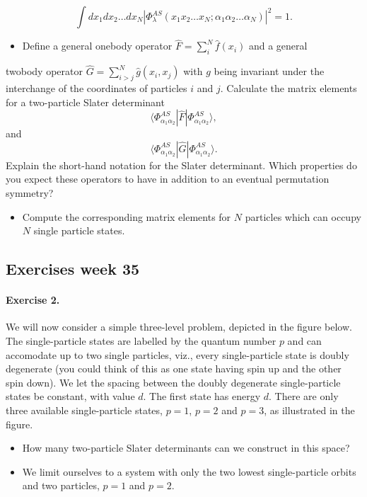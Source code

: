 \documentclass[%
twoside,                 %
final,                   %
10pt]{article}
\begin{document}
\noindent
\[
\int dx_{1}dx_{2}\dots dx_{N}\left\vert
\Phi_{\lambda}^{AS}(x_{1}x_{2}\dots x_{N};\alpha_{1}\alpha_{2}\dots\alpha_{N})
\right\vert^{2} = 1.
\]
\begin{itemize}
\item Define a general onebody operator $\hat{F} = \sum_{i}^N\hat{f}(x_{i})$ and a general 
\end{itemize}

\noindent
twobody operator $\hat{G}=\sum_{i>j}^N\hat{g}(x_{i},x_{j})$
with $g$ being invariant under the interchange of the coordinates of particles $i$ and $j$.
Calculate the matrix elements for a two-particle Slater determinant
\[
\langle\Phi_{\alpha_{1}\alpha_{2}}^{AS}|\hat{F}|\Phi_{\alpha_{1}\alpha_{2}}^{AS} \rangle,
\]
and
\[
\langle \Phi_{\alpha_{1}\alpha_{2}}^{AS}|\hat{G}|\Phi_{\alpha_{1}\alpha_{2}}^{AS}\rangle.
\]
Explain the short-hand notation for the Slater determinant.
Which properties do you expect these operators to have in addition to an eventual permutation
symmetry?
\begin{itemize}
\item Compute the corresponding matrix elements for $N$ particles which can occupy $N$ single particle states.
\end{itemize}

\noindent




\subsection{Exercises week 35}

\paragraph{Exercise 2.}
We will now consider a simple three-level problem, depicted in the figure below. 
The single-particle states are labelled by the quantum number $p$ and can accomodate up to two single particles, 
viz., every single-particle state 
is doubly degenerate (you could think of this as one state having spin up and the other spin down). 
We let the spacing between the doubly degenerate single-particle states be constant, with value $d$.  The first state
has energy $d$. There are only three available single-particle states, $p=1$, $p=2$ and $p=3$, as illustrated
in the figure. 
\begin{itemize}
\item How many two-particle Slater determinants can we construct in this space? 

\item We limit ourselves to a system with only the two lowest single-particle orbits and two particles, $p=1$ and $p=2$.
\end{itemize}
\end{document}
